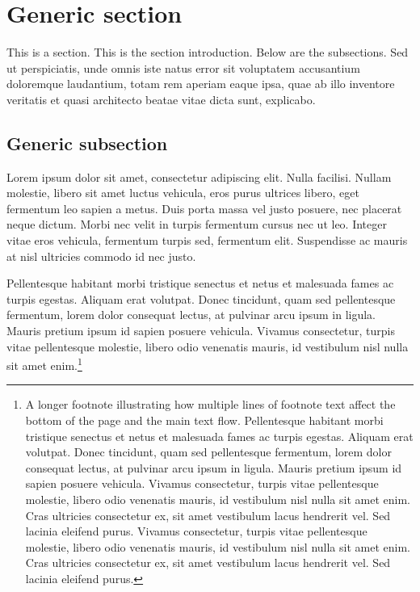 \documentclass[letterpaper,11pt,leqno]{article}
\begin{document}
\section{Generic section}\label{s:section}

This is a section. This is the section introduction. Below are the subsections. Sed ut perspiciatis, unde omnis iste natus error sit voluptatem accusantium doloremque laudantium, totam rem aperiam eaque ipsa, quae ab illo inventore veritatis et quasi architecto beatae vitae dicta sunt, explicabo. 

\subsection{Generic subsection}

Lorem ipsum dolor sit amet, consectetur adipiscing elit. Nulla facilisi. Nullam molestie, libero sit amet luctus vehicula, eros purus ultrices libero, eget fermentum leo sapien a metus. Duis porta massa vel justo posuere, nec placerat neque dictum. Morbi nec velit in turpis fermentum cursus nec ut leo. Integer vitae eros vehicula, fermentum turpis sed, fermentum elit. Suspendisse ac mauris at nisl ultricies commodo id nec justo. 

Pellentesque habitant morbi tristique senectus et netus et malesuada fames ac turpis egestas. Aliquam erat volutpat. Donec tincidunt, quam sed pellentesque fermentum, lorem dolor consequat lectus, at pulvinar arcu ipsum in ligula. Mauris pretium ipsum id sapien posuere vehicula. Vivamus consectetur, turpis vitae pellentesque molestie, libero odio venenatis mauris, id vestibulum nisl nulla sit amet enim.\footnote{A longer footnote illustrating how multiple lines of footnote text affect the bottom of the page and the main text flow. Pellentesque habitant morbi tristique senectus et netus et malesuada fames ac turpis egestas. Aliquam erat volutpat. Donec tincidunt, quam sed pellentesque fermentum, lorem dolor consequat lectus, at pulvinar arcu ipsum in ligula. Mauris pretium ipsum id sapien posuere vehicula. Vivamus consectetur, turpis vitae pellentesque molestie, libero odio venenatis mauris, id vestibulum nisl nulla sit amet enim. Cras ultricies consectetur ex, sit amet vestibulum lacus hendrerit vel. Sed lacinia eleifend purus. Vivamus consectetur, turpis vitae pellentesque molestie, libero odio venenatis mauris, id vestibulum nisl nulla sit amet enim. Cras ultricies consectetur ex, sit amet vestibulum lacus hendrerit vel. Sed lacinia eleifend purus.} 
\end{document}
